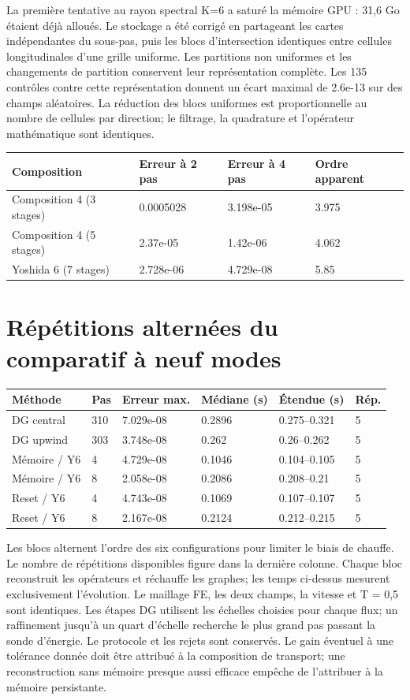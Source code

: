 \documentclass[10pt,a4paper]{article}
\begin{document}
La première tentative au rayon spectral K=6 a saturé la mémoire GPU : 31,6 Go étaient déjà alloués. Le stockage a été corrigé en partageant les cartes indépendantes du sous-pas, puis les blocs d’intersection identiques entre cellules longitudinales d’une grille uniforme. Les partitions non uniformes et les changements de partition conservent leur représentation complète. Les 135 contrôles contre cette représentation donnent un écart maximal de 2.6e-13 sur des champs aléatoires. La réduction des blocs uniformes est proportionnelle au nombre de cellules par direction; le filtrage, la quadrature et l’opérateur mathématique sont identiques.

\begin{center}\small\begin{tabular}{llll}\toprule
Composition & Erreur à 2 pas & Erreur à 4 pas & Ordre apparent\\\midrule
Composition 4 (3 stages) & 0.0005028 & 3.198e-05 & 3.975\\
Composition 4 (5 stages) & 2.37e-05 & 1.42e-06 & 4.062\\
Yoshida 6 (7 stages) & 2.728e-06 & 4.729e-08 & 5.85\\
\bottomrule\end{tabular}\end{center}
\section{Répétitions alternées du comparatif à neuf modes}
\begin{center}\small\begin{tabular}{llllll}\toprule
Méthode & Pas & Erreur max. & Médiane (s) & Étendue (s) & Rép.\\\midrule
DG central & 310 & 7.029e-08 & 0.2896 & 0.275–0.321 & 5\\
DG upwind & 303 & 3.748e-08 & 0.262 & 0.26–0.262 & 5\\
Mémoire / Y6 & 4 & 4.729e-08 & 0.1046 & 0.104–0.105 & 5\\
Mémoire / Y6 & 8 & 2.058e-08 & 0.2086 & 0.208–0.21 & 5\\
Reset / Y6 & 4 & 4.743e-08 & 0.1069 & 0.107–0.107 & 5\\
Reset / Y6 & 8 & 2.167e-08 & 0.2124 & 0.212–0.215 & 5\\
\bottomrule\end{tabular}\end{center}
Les blocs alternent l’ordre des six configurations pour limiter le biais de chauffe. Le nombre de répétitions disponibles figure dans la dernière colonne. Chaque bloc reconstruit les opérateurs et réchauffe les graphes; les temps ci-dessus mesurent exclusivement l’évolution. Le maillage FE, les deux champs, la vitesse et T = 0,5 sont identiques. Les étapes DG utilisent les échelles choisies pour chaque flux; un raffinement jusqu’à un quart d’échelle recherche le plus grand pas passant la sonde d’énergie. Le protocole et les rejets sont conservés. Le gain éventuel à une tolérance donnée doit être attribué à la composition de transport; une reconstruction sans mémoire presque aussi efficace empêche de l’attribuer à la mémoire persistante.
\end{document}
